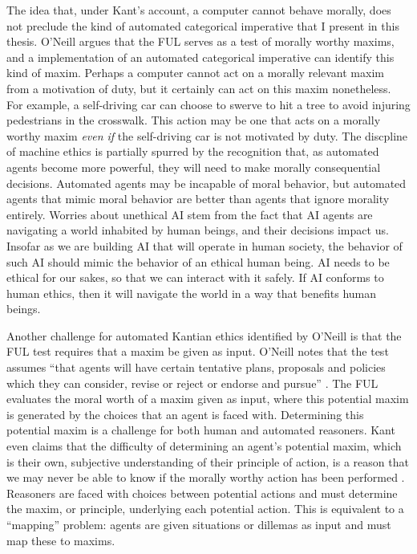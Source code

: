 \begin{isabellebody}
\begin{isamarkuptext}
The idea that, under Kant's account, a computer cannot behave morally, does not preclude the kind 
of automated categorical imperative that I present in this thesis. O'Neill argues that the FUL
serves as a test of morally worthy maxims, and a implementation of an automated categorical imperative can 
identify this kind of maxim. Perhaps a computer cannot act on a morally relevant maxim from a motivation of duty, 
but it certainly can act on this maxim nonetheless. For example, a self-driving car can choose to swerve to hit a tree
to avoid injuring pedestrians in the crosswalk. This action may be one that acts on a morally worthy maxim
\emph{even if} the self-driving car is not motivated by duty. The discpline of machine ethics is partially
spurred by the recognition that, as automated agents become more powerful, they will need to make
morally consequential decisions. Automated agents may be incapable of moral behavior, but automated agents that mimic
moral behavior are better than agents that ignore morality entirely. Worries about unethical AI
stem from the fact that AI agents are navigating a world inhabited by human beings, and their decisions
impact us. Insofar as we are building AI that will operate in human society, the behavior of such AI 
should mimic the behavior of an ethical human being. AI needs to be ethical for our sakes, so that we 
can interact with it safely. If AI conforms to human ethics, then it will navigate the world
in a way that benefits human beings.

Another challenge for automated Kantian ethics identified by O'Neill is that the FUL test requires that
a maxim be given as input. O'Neill notes that the test assumes ``that agents will have certain tentative 
plans, proposals and policies which they can consider, revise or reject or endorse and pursue'' \citep[343]{oneilluniversallaws}.
The FUL evaluates the moral worth of a maxim given as input, where this potential maxim is generated by 
the choices that an agent is faced with. Determining this potential maxim is a challenge for both human
and automated reasoners. Kant even claims that the difficulty of determining an agent's potential maxim, which is their
own, subjective understanding of their principle of action, is a reason that we may never be able 
to know if the morally worthy action has been performed \cite[345]{oneilluniversallaws}. Reasoners are faced with
choices between potential actions and must determine the maxim, or principle, underlying each potential action.
This is equivalent to a ``mapping'' problem: agents are given situations or dillemas as input and must map
these to maxims.


\end{isamarkuptext}
\end{isabellebody}
